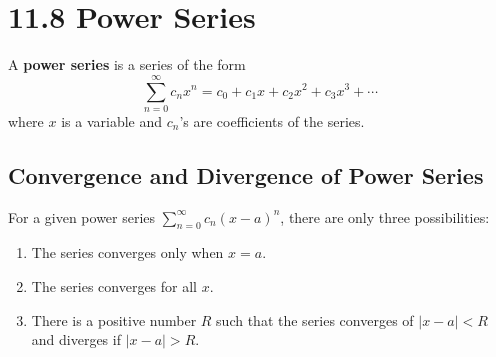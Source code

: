 %
%

\section*{11.8 Power Series}

A \textbf{power series} is a series of the form
\[\sum_{n=0}^{\infty}{c_n x^n} = c_0 + c_1 x + c_2 x^2 + c_3 x^3 + \cdots\]
where \(x\) is a variable and \(c_n\)'s are coefficients of the series.

\subsection*{Convergence and Divergence of Power Series}

For a given power series \(\sum_{n=0}^{\infty}{c_n (x-a)^n}\), there are only
three possibilities:
\begin{enumerate}
    \item The series converges only when \(x=a\).
    \item The series converges for all \(x\).
    \item There is a positive number \(R\) such that the series converges of
\(|x-a| < R\) and diverges if \(|x-a|>R\).
\end{enumerate}

